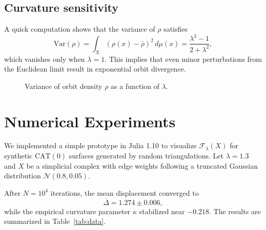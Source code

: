 \documentclass{amsart}
\begin{document}
\subsection{Curvature sensitivity}
A %
quick computation shows that the variance of $\rho$ satisfies
\begin{equation}\label{eq:var}
    \mathrm{Var}(\rho) = \int_X (\rho(x) - \bar\rho)^2\,d\mu(x) = \frac{\lambda^3 - 1}{2+\lambda^2},
\end{equation}
which vanishes only when $\lambda = 1$.  
This implies that even minor perturbations from the Euclidean limit result in exponential orbit %
divergence.

\begin{figure}[htbp]
\centering
{}
\caption{Variance of orbit density $\rho$ as a function of $\lambda$.}
\end{figure}

\section{Numerical Experiments}

We implemented a simple prototype in \textsf{Julia 1.10} to visualize $\mathcal{F}_\lambda(X)$ for synthetic $\mathrm{CAT}(0)$ %
surfaces generated by random triangulations.
Let $\lambda = 1.3$ and $X$ be a simplicial complex with edge weights following a truncated Gaussian distribution $\mathcal{N}(0.8, 0.05)$.  

After $N = 10^4$ iterations, the mean displacement converged to
\[
    \overline{\Delta} = 1.274 \pm 0.006,
\]
while the empirical curvature parameter $\kappa$ stabilized near $-0.218$.  
The results are summarized in Table~\ref{tab:data}.
\end{document}
